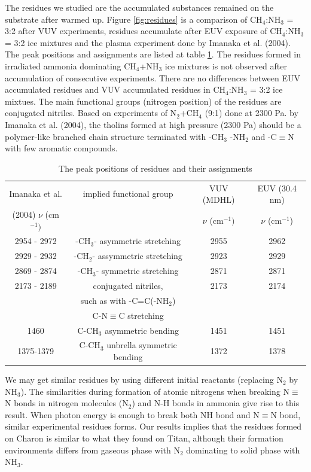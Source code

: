 The residues we studied are the accumulated substances remained on the substrate after warmed up. Figure \ref{fig:residues} is a comparison of CH$_4$:NH$_3$ = 3:2 after VUV experiments, residues accumulate after EUV exposure of CH$_4$:NH$_3$ = 3:2 ice mixtures and the plasma experiment done by Imanaka et al. (2004)\cite{imanaka2004laboratory}. The peak positions and assignments are listed at table \ref{tab:residue}. The residues formed in irradiated ammonia dominating CH$_4$+NH$_3$ ice mixtures is not observed after accumulation of consecutive experiments. There are no differences between EUV accumulated residues and VUV accumulated residues in CH$_4$:NH$_3$ = 3:2 ice mixtues. The main functional groups (nitrogen position) of the residues are conjugated nitriles. Based on experiments of N$_2$+CH$_4$ (9:1) done at 2300 Pa. by Imanaka et al. (2004)\cite{imanaka2004laboratory}, the tholins formed at high pressure (2300 Pa) should be a polymer-like branched chain structure terminated with -CH$_3$ -NH$_2$ and -C$\equiv$N with few aromatic compounds.\\

\begin{table}[htbp]
\caption{The peak positions of residues and their assignments}
\label{tab:residue}
\begin{tabular}{cccc}
\hline
\hline
Imanaka et al. & implied functional group & VUV (MDHL) & EUV (30.4 nm)\\
(2004) $\nu$ (cm$^{-1})$ & & $\nu$ (cm$^{-1})$ & $\nu$ (cm$^{-1}$) \\
\hline
2954 - 2972 & -CH$_3$- asymmetric stretching & 2955 & 2962 \\
2929 - 2932 & -CH$_2$- assymmetric stretching & 2923 & 2929 \\
2869 - 2874 & -CH$_3$- symmetric stretching & 2871 & 2871 \\
2173 - 2189 & conjugated nitriles, & 2173 & 2174 \\
 & such as with -C=C(-NH$_2$)& & \\
 & C-N$\equiv$C stretching& & \\
1460 & C-CH$_3$ asymmetric bending & 1451 & 1451 \\
1375-1379 & C-CH$_3$ unbrella symmetric bending & 1372 & 1378 \\
\hline
\end{tabular}
\end{table}

We may get similar residues by using different initial reactants (replacing N$_2$ by NH$_3$). The similarities during formation of atomic nitrogens when breaking N$\equiv$N bonds in nitrogen molecules (N$_2$) and N-H bonds in ammonia give rise to this result. When photon energy is enough to break both NH bond and N$\equiv$N bond, similar experimental residues forms. Our results implies that the residues formed on Charon is similar to what they found on Titan, although their formation environments differs from gaseous phase with N$_2$ dominating to solid phase with NH$_3$.\\

